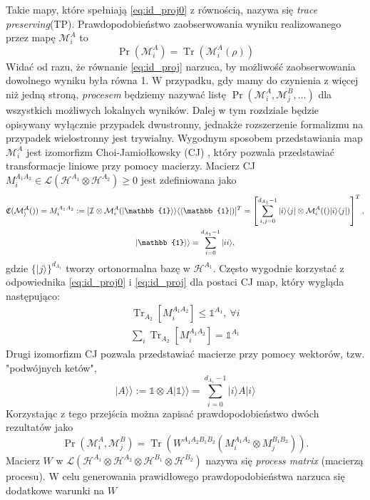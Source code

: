 \documentclass[10pt]{article} %
\DeclareMathOperator{\Trs}{Tr}
\newcommand{\Mats}[1]{\mathcal{L}(#1)}
\newcommand{\Hx}[1]{\mathcal{H}^{#1}}
\newcommand{\HAi}{\Hx{A_1}}
\newcommand{\MXi}[3]{\mathcal{M}^{#1}_{#2}(#3)}
\newcommand{\MXin}[2]{\mathcal{M}^{#1}_{#2}}
\newcommand{\MAin}[0]{\MXin{A}{i}}
\newcommand{\MAi}[1]{\MXi{A}{i}{#1}}
\newcommand{\MAir}{\MAi{\rho}}
\newcommand{\Tr}[1]{\Trs(#1)}
\newcommand{\Pro}[1]{\Pr(#1)}
\newcommand{\Prt}[2]{\Pr(#1, #2)}
\newcommand{\Ket}[1]{|#1\rangle}
\newcommand{\Bra}[1]{\langle#1|}
\newcommand{\BBra}[1]{\langle\langle#1|}
\newcommand{\KKet}[1]{|#1\rangle\rangle}
\newcommand{\TP}{\textit{trace preserving}}
\newcommand{\WAll}{W^{A_1A_2B_1B_2}}
\newcommand{\I}{\mathbb{1}}
\newcommand{\MCJ}{\mathfrak{C}}
\begin{document}
Takie mapy, które spełniają \eqref{eq:id_proj0} z równością, nazywa się \TP (TP).
Prawdopodobieństwo zaobserwowania wyniku realizowanego przez mapę $\MAin$ to
\begin{equation}
\Pro{\MAin} = \Tr{\MAir}
\end{equation}
Widać od razu, że równanie \eqref{eq:id_proj} narzuca, by możliwość zaobserwowania dowolnego wyniku była równa 1.
W przypadku, gdy mamy do czynienia z więcej niż jedną stroną, \textit{procesem} będziemy nazywać listę $\Pr(\MXin{A}{i}, \MXin{B}{j}, \dots)$ dla wszystkich możliwych lokalnych wyników. Dalej w tym rozdziale będzie opisywany wyłącznie przypadek dwustronny, jednakże rozszerzenie formalizmu na przypadek wielostronny jest trywialny. Wygodnym sposobem przedstawiania map $\MAin$ jest izomorfizm Choi-Jamiołkowsky (CJ) \cite{cj_iso1, cj_iso2}, który pozwala przedstawiać transformacje liniowe przy pomocy macierzy. Macierz CJ $M^{A_1A_2}_i \in \Mats{\Hx{A_1} \otimes \Hx{A_2}} \geq 0$ jest zdefiniowana jako
\begin{gather}
\label{eq:cj_iso}
\MCJ (\mathcal{\MAi}) = M^{A_1A_2}_i := [\mathcal{I} \otimes \MAi{ \KKet{\I} \BBra{\I}}]^T= \left[\sum^{d_{A_1}-1}_{i,j=0} \Ket{i}\Bra{j} \otimes \MAi(\Ket{i}\Bra{j})\right]^T, \\
\KKet{\I} = \sum^{d_{A_1}-1}_{i=0} \Ket{ii},
\end{gather}
gdzie $\{\Ket{j}\}^{d_{A_1}}$ tworzy ortonormalna bazę w $\HAi$. 
Często wygodnie korzystać z odpowiednika \eqref{eq:id_proj0} i \eqref{eq:id_proj} dla postaci CJ map, który wygląda następująco:
\begin{gather}
\Trs_{A_2} \left[ M^{A_1A_2}_i \right] \leq \I^{A_1},~\forall i\\ 
\sum_i \Trs_{A_2} \left[ M^{A_1A_2}_i \right] = \I^{A_1}
\end{gather}
Drugi izomorfizm CJ pozwala przedstawiać macierze przy pomocy wektorów, tzw. "podwójnych ketów",
\begin{equation}
\KKet{A} := \I \otimes A\KKet{\I} = \sum^{d_{A_1}-1}_{i=0} \Ket{i} A \Ket{i}
\end{equation}
Korzystając z tego przejścia można zapisać prawdopodobieństwo dwóch rezultatów jako 
\begin{equation}
\label{eq:cj_prob}
\Prt{\MAin}{\MXin{B}{j}} = \Tr{\WAll(M^{A_1A_2}_i \otimes M^{B_1B_2}_j)}.
\end{equation}
Macierz $W$ w $\Mats{\Hx{A_1} \otimes \Hx{A_2} \otimes \Hx{B_1} \otimes \Hx{B_2}}$ nazywa się \textit{process matrix} (macierzą procesu).
W celu generowania prawidłowego prawdopodobieństwa narzuca się dodatkowe warunki na $W$
\end{document}
